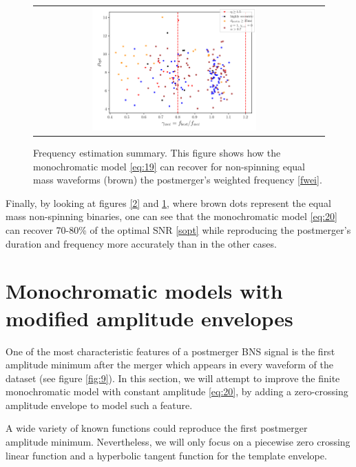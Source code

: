 \FloatBarrier

\begin{figure}[hbt!]
\begin{center}
\begin{tabular}{cc}
\includegraphics[width=0.6\textwidth, angle=0]{images/Data_analysis/results/alpha_sum2.pdf}
\end{tabular}
\captionsetup{width=0.8\textwidth}
\caption[Frequency estimation summary]
{Frequency estimation summary. This figure shows how the monochromatic model \ref{eq:19} can recover for non-spinning equal mass waveforms (brown) the postmerger's weighted frequency \ref{fwei}.
}
\label{3}
\end{center}
\end{figure}

\FloatBarrier

Finally, by looking at figures \ref{2} and \ref{3}, where brown dots represent the equal mass non-spinning binaries, one can see that the monochromatic model \ref{eq:20} can recover 70-80\% of the optimal SNR \ref{sopt} while reproducing the postmerger's duration and frequency more accurately than in the other cases.





\newpage
\section{Monochromatic models with modified amplitude envelopes}\label{zc-aenv}
One of the most characteristic features of a postmerger BNS signal is the first amplitude minimum after the merger which appears in every waveform of the dataset (see figure \ref{fig:9}). In this section, we will attempt to improve the finite monochromatic model with constant amplitude \ref{eq:20}, by adding a zero-crossing amplitude envelope to model such a feature. 

A wide variety of known functions could reproduce the first postmerger amplitude minimum. Nevertheless, we will only focus on a piecewise zero crossing linear function and a hyperbolic tangent function for the template envelope. 

